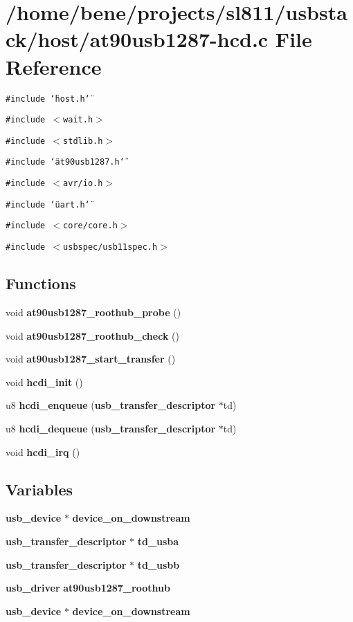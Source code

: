 \section{/home/bene/projects/sl811/usbstack/host/at90usb1287-hcd.c File Reference}
\label{at90usb1287-hcd_8c}
{\tt \#include \char`\"{}host.h\char`\"{}}\par
{\tt \#include $<$wait.h$>$}\par
{\tt \#include $<$stdlib.h$>$}\par
{\tt \#include \char`\"{}at90usb1287.h\char`\"{}}\par
{\tt \#include $<$avr/io.h$>$}\par
{\tt \#include \char`\"{}uart.h\char`\"{}}\par
{\tt \#include $<$core/core.h$>$}\par
{\tt \#include $<$usbspec/usb11spec.h$>$}\par
\subsection*{Functions}
\begin{CompactItemize}
\item 
void {\bf at90usb1287\_\-roothub\_\-probe} ()
\item 
void {\bf at90usb1287\_\-roothub\_\-check} ()
\item 
void {\bf at90usb1287\_\-start\_\-transfer} ()
\item 
void {\bf hcdi\_\-init} ()
\item 
u8 {\bf hcdi\_\-enqueue} ({\bf usb\_\-transfer\_\-descriptor} $\ast$td)
\item 
u8 {\bf hcdi\_\-dequeue} ({\bf usb\_\-transfer\_\-descriptor} $\ast$td)
\item 
void {\bf hcdi\_\-irq} ()
\end{CompactItemize}
\subsection*{Variables}
\begin{CompactItemize}
\item 
{\bf usb\_\-device} $\ast$ {\bf device\_\-on\_\-downstream}
\item 
{\bf usb\_\-transfer\_\-descriptor} $\ast$ {\bf td\_\-usba}
\item 
{\bf usb\_\-transfer\_\-descriptor} $\ast$ {\bf td\_\-usbb}
\item 
{\bf usb\_\-driver} {\bf at90usb1287\_\-roothub}
\item 
{\bf usb\_\-device} $\ast$ {\bf device\_\-on\_\-downstream}
\end{CompactItemize}


